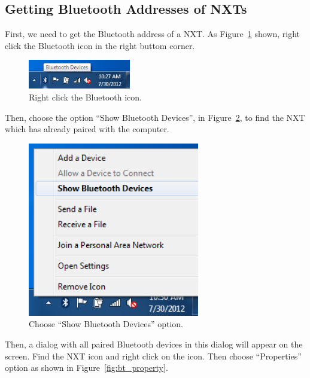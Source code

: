 \documentclass[11pt]{article}
\begin{document}
\subsection{Getting Bluetooth Addresses of NXTs}
First, we need to get the Bluetooth address of a NXT. As Figure~\ref{fig:bt_device} 
shown, right click the Bluetooth icon in the right buttom corner.
\begin{figure}[H]
  \begin{center}
    \includegraphics[height=0.5in]{figure/configuration/getBTaddress/bt1.png}
    \caption{Right click the Bluetooth icon.\label{fig:bt_device}}
  \end{center}
\end{figure}
Then, choose the option ``Show Bluetooth Devices'', in Figure~\ref{fig:bt_show_device}, 
to find the NXT which has already paired with the computer.
\begin{figure}[H]
  \begin{center}
    \includegraphics[height=3in]{figure/configuration/getBTaddress/btShowDevices.png}
    \caption{Choose ``Show Bluetooth Devices'' option.\label{fig:bt_show_device}}
  \end{center}
\end{figure}
Then, a dialog with all paired Bluetooth devices in this dialog will appear on 
the screen. Find the NXT icon and right click on the icon. Then choose 
``Properties'' option as shown in Figure~\ref{fig:bt_property}.
\end{document}
